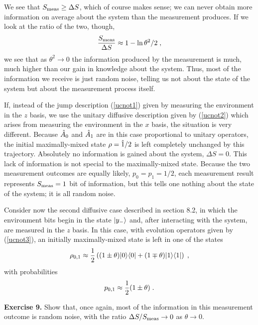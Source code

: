 We see that $S_{\rm meas} \ge \Delta S$, which of course makes sense;
we can never obtain more information on average about the system than
the measurement produces.  If we look at the ratio of the two, though,
\begin{equation}
{ S_{\rm meas} \over \Delta S } \approx 1 - \ln \theta^2/2 \;,
\label{ratio}
\end{equation}
we see that as $\theta^2 \rightarrow 0$ the information produced by the
measurement is much, much higher than our gain in knowledge about the
system.  Thus, most of the information we receive is just random noise,
telling us not about the state of the system but about the measurement
process itself.

If, instead of the jump description (\ref{ucnot1}) given by measuring
the environment in the $z$ basis, we use the unitary diffusive description
given by (\ref{ucnot2}) which arises from measuring the environment in the
$x$ basis, the situation is very different.  Because ${\hat A}_0$ and
${\hat A}_1$ are in this case proportional to unitary operators, the initial
maximally-mixed state $\rho = {\hat 1}/2$ is left completely unchanged by
this trajectory.  Absolutely no information is gained about the system,
$\Delta S = 0$.  This lack of information is not special to the
maximally-mixed state.  Because the two measurement outcomes are equally
likely, $p_0 = p_1 = 1/2$, each measurement result represents
$S_{\rm meas}=1$ bit of information, but this tells one nothing about
the state of the system; it is all random noise.

Consider now the second diffusive case described in section 8.2,
in which the environment bits begin
in the state ${| y_- \rangle}$ and, after interacting with the system, are
measured in the $z$ basis.  In this case, with evolution operators given
by (\ref{ucnot3}), an initially maximally-mixed state is left in one of
the states
\begin{equation}
\rho_{0,1} \approx {1\over2}\left( (1\pm\theta){| 0 \rangle}{\langle 0 |}
  + (1\mp\theta){| 1 \rangle}{\langle 1 |} \right) \;,
\label{less_mixed}
\end{equation}
with probabilities
\begin{equation}
p_{0,1} \approx {1\over2}(1\pm\theta) \;.
\end{equation}

\medskip\noindent
{\bf Exercise 9.}  Show that, once again, most of the information
in this measurement outcome is random noise, with the ratio
$\Delta S/S_{\rm meas} \rightarrow 0$ as $\theta\rightarrow0$.
\medskip

